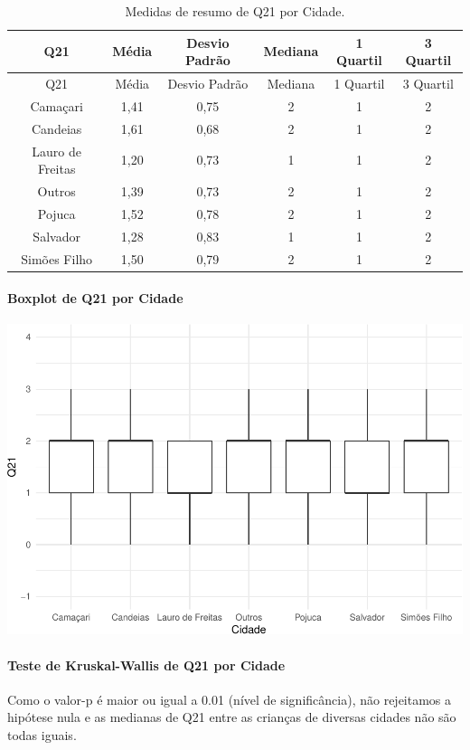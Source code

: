 \documentclass[]{article}
\let\oldparagraph\paragraph
\renewcommand{\paragraph}[1]{\oldparagraph{#1}\mbox{}}
\begin{document}
\begin{longtable}[]{@{}cccccc@{}}
\caption{\label{tab:unnamed-chunk-429}Medidas de resumo de Q21 por Cidade.}\tabularnewline
\toprule
Q21 & Média & Desvio Padrão & Mediana & 1 Quartil & 3 Quartil\tabularnewline
\midrule
\endfirsthead
\toprule
Q21 & Média & Desvio Padrão & Mediana & 1 Quartil & 3 Quartil\tabularnewline
\midrule
\endhead
Camaçari & 1,41 & 0,75 & 2 & 1 & 2\tabularnewline
Candeias & 1,61 & 0,68 & 2 & 1 & 2\tabularnewline
Lauro de Freitas & 1,20 & 0,73 & 1 & 1 & 2\tabularnewline
Outros & 1,39 & 0,73 & 2 & 1 & 2\tabularnewline
Pojuca & 1,52 & 0,78 & 2 & 1 & 2\tabularnewline
Salvador & 1,28 & 0,83 & 1 & 1 & 2\tabularnewline
Simões Filho & 1,50 & 0,79 & 2 & 1 & 2\tabularnewline
\bottomrule
\end{longtable}

\hypertarget{boxplot-de-q21-por-cidade}{%
\paragraph{Boxplot de Q21 por Cidade}\label{boxplot-de-q21-por-cidade}}

\begin{center}\includegraphics[width=0.75\linewidth]{relatorio_covid19_files/figure-latex/unnamed-chunk-430-1} \end{center}

\hypertarget{teste-de-kruskal-wallis-de-q21-por-cidade}{%
\paragraph{Teste de Kruskal-Wallis de Q21 por Cidade}\label{teste-de-kruskal-wallis-de-q21-por-cidade}}

Como o valor-p é maior ou igual a 0.01 (nível de significância), não rejeitamos a hipótese nula e as medianas de Q21 entre as crianças de diversas cidades não são todas iguais.
\end{document}
